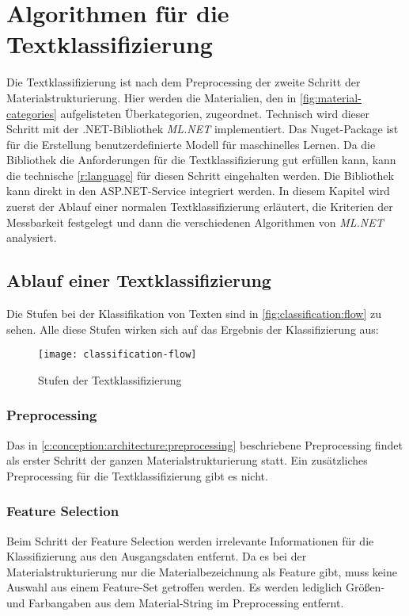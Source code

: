 \section{Algorithmen für die Textklassifizierung}
\label{c:conception:classification}
Die Textklassifizierung ist nach dem Preprocessing der zweite Schritt der Materialstrukturierung. Hier werden die Materialien, den in \autoref{fig:material-categories} aufgelisteten Überkategorien, zugeordnet.
Technisch wird dieser Schritt mit der .NET-Bibliothek \textit{ML.NET} \citep[vgl.][]{Ahmed_2019} implementiert. Das Nuget-Package ist für die Erstellung benutzerdefinierte Modell für maschinelles Lernen. \citep[vgl.][]{mlnet_doc2022} Da die Bibliothek die Anforderungen für die Textklassifizierung gut erfüllen kann, kann die technische \autoref{r:language} für diesen Schritt eingehalten werden. Die Bibliothek kann direkt in den ASP.NET-Service integriert werden.
In diesem Kapitel wird zuerst der Ablauf einer normalen Textklassifizierung erläutert, die Kriterien der Messbarkeit festgelegt und dann die verschiedenen Algorithmen von \textit{ML.NET} analysiert.

\subsection{Ablauf einer Textklassifizierung}
\label{c:conception:classification:steps}
Die Stufen bei der Klassifikation von Texten sind in \autoref{fig:classification:flow} zu sehen. Alle diese Stufen wirken sich auf das Ergebnis der Klassifizierung aus:

\begin{figure}[h]
	\centering
	\texttt{[image: classification-flow]}
	\caption{Stufen der Textklassifizierung}
	\label{fig:classification:flow}
\end{figure}

\subsubsection{Preprocessing}
Das in \autoref{c:conception:architecture:preprocessing} beschriebene Preprocessing findet als erster Schritt der ganzen Materialstrukturierung statt. Ein zusätzliches Preprocessing für die Textklassifizierung gibt es nicht.

\subsubsection{Feature Selection}
Beim Schritt der Feature Selection werden irrelevante Informationen für die Klassifizierung aus den Ausgangsdaten entfernt. Da es bei der Materialstrukturierung nur die Materialbezeichnung als Feature gibt, muss keine Auswahl aus einem Feature-Set getroffen werden. Es werden lediglich Größen- und Farbangaben aus dem Material-String im Preprocessing entfernt.

